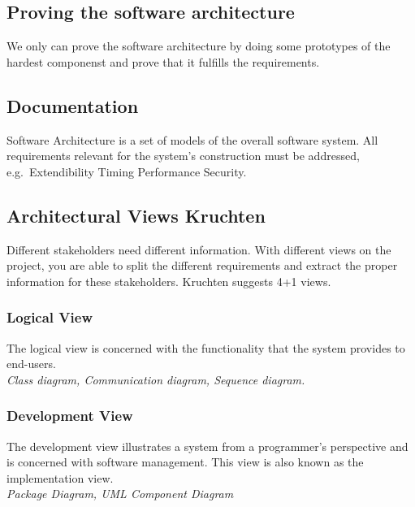 \hypertarget{proving-the-software-architecture}{%
\subsection{Proving the software
architecture}\label{proving-the-software-architecture}}

We only can prove the software architecture by doing some prototypes of
the hardest componenst and prove that it fulfills the requirements.

\hypertarget{documentation}{%
\subsection{Documentation}\label{documentation}}

Software Architecture is a set of models of the overall software system.
All requirements relevant for the system's construction must be
addressed, e.g.~Extendibility Timing Performance Security.

\hypertarget{architectural-views-kruchten}{%
\subsection{Architectural Views
Kruchten}\label{architectural-views-kruchten}}

Different stakeholders need different information. With different views
on the project, you are able to split the different requirements and
extract the proper information for these stakeholders. Kruchten suggests
4+1 views.

\hypertarget{logical-view}{%
\subsubsection{Logical View}\label{logical-view}}

The logical view is concerned with the functionality that the system
provides to end-users.\\
\textit{Class diagram, Communication diagram, Sequence diagram.}

\hypertarget{development-view}{%
\subsubsection{Development View}\label{development-view}}

The development view illustrates a system from a programmer's
perspective and is concerned with software management. This view is also
known as the implementation view.\\
\textit{Package Diagram, UML Component Diagram}


